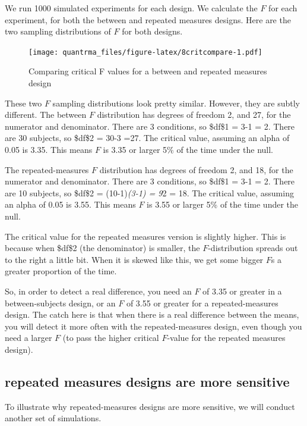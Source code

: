 \documentclass[
]{book}
\begin{document}
We run 1000 simulated experiments for each design. We calculate the \(F\) for each experiment, for both the between and repeated measures designs. Here are the two sampling distributions of \(F\) for both designs.

\begin{figure}
\centering
\texttt{[image: quantrma\_files/figure-latex/8critcompare-1.pdf]}
\caption{\label{fig:8critcompare}Comparing critical F values for a between and repeated measures design}
\end{figure}

These two \(F\) sampling distributions look pretty similar. However, they are subtly different. The between \(F\) distribution has degrees of freedom 2, and 27, for the numerator and denominator. There are 3 conditions, so \$df\$1 = 3-1 = 2. There are 30 subjects, so \$df\$2 = 30-3 =27. The critical value, assuming an alpha of 0.05 is 3.35. This means \(F\) is 3.35 or larger 5\% of the time under the null.

The repeated-measures \(F\) distribution has degrees of freedom 2, and 18, for the numerator and denominator. There are 3 conditions, so \$df\$1 = 3-1 = 2. There are 10 subjects, so \$df\$2 = (10-1)\emph{(3-1) = 9}2 = 18. The critical value, assuming an alpha of 0.05 is 3.55. This means \(F\) is 3.55 or larger 5\% of the time under the null.

The critical value for the repeated measures version is slightly higher. This is because when \$df\$2 (the denominator) is smaller, the \(F\)-distribution spreads out to the right a little bit. When it is skewed like this, we get some bigger \(F\)s a greater proportion of the time.

So, in order to detect a real difference, you need an \(F\) of 3.35 or greater in a between-subjects design, or an \(F\) of 3.55 or greater for a repeated-measures design. The catch here is that when there is a real difference between the means, you will detect it more often with the repeated-measures design, even though you need a larger \(F\) (to pass the higher critical \(F\)-value for the repeated measures design).

\hypertarget{repeated-measures-designs-are-more-sensitive}{%
\subsection{repeated measures designs are more sensitive}\label{repeated-measures-designs-are-more-sensitive}}

To illustrate why repeated-measures designs are more sensitive, we will conduct another set of simulations.
\end{document}
